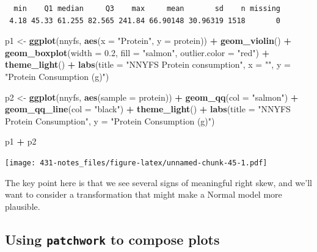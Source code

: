 \documentclass[
]{book}
\newenvironment{Shaded}{\begin{snugshade}}{\end{snugshade}}
\newcommand{\DataTypeTok}[1]{\textcolor[rgb]{0.13,0.29,0.53}{#1}}
\newcommand{\FloatTok}[1]{\textcolor[rgb]{0.00,0.00,0.81}{#1}}
\newcommand{\KeywordTok}[1]{\textcolor[rgb]{0.13,0.29,0.53}{\textbf{#1}}}
\newcommand{\NormalTok}[1]{#1}
\newcommand{\OperatorTok}[1]{\textcolor[rgb]{0.81,0.36,0.00}{\textbf{#1}}}
\newcommand{\StringTok}[1]{\textcolor[rgb]{0.31,0.60,0.02}{#1}}
\begin{document}
\begin{verbatim}
  min    Q1 median     Q3    max     mean       sd    n missing
 4.18 45.33 61.255 82.565 241.84 66.90148 30.96319 1518       0
\end{verbatim}

\begin{Shaded}
\begin{Highlighting}[]
\NormalTok{p1 <-}\StringTok{ }\KeywordTok{ggplot}\NormalTok{(nnyfs, }\KeywordTok{aes}\NormalTok{(}\DataTypeTok{x =} \StringTok{"Protein"}\NormalTok{, }\DataTypeTok{y =}\NormalTok{ protein)) }\OperatorTok{+}
\StringTok{    }\KeywordTok{geom_violin}\NormalTok{() }\OperatorTok{+}
\StringTok{    }\KeywordTok{geom_boxplot}\NormalTok{(}\DataTypeTok{width =} \FloatTok{0.2}\NormalTok{, }\DataTypeTok{fill =} \StringTok{"salmon"}\NormalTok{, }
                 \DataTypeTok{outlier.color =} \StringTok{"red"}\NormalTok{) }\OperatorTok{+}
\StringTok{    }\KeywordTok{theme_light}\NormalTok{() }\OperatorTok{+}
\StringTok{    }\KeywordTok{labs}\NormalTok{(}\DataTypeTok{title =} \StringTok{"NNYFS Protein consumption"}\NormalTok{,}
         \DataTypeTok{x =} \StringTok{""}\NormalTok{, }\DataTypeTok{y =} \StringTok{"Protein Consumption (g)"}\NormalTok{)}

\NormalTok{p2 <-}\StringTok{ }\KeywordTok{ggplot}\NormalTok{(nnyfs, }\KeywordTok{aes}\NormalTok{(}\DataTypeTok{sample =}\NormalTok{ protein)) }\OperatorTok{+}
\StringTok{    }\KeywordTok{geom_qq}\NormalTok{(}\DataTypeTok{col =} \StringTok{"salmon"}\NormalTok{) }\OperatorTok{+}\StringTok{ }
\StringTok{    }\KeywordTok{geom_qq_line}\NormalTok{(}\DataTypeTok{col =} \StringTok{"black"}\NormalTok{) }\OperatorTok{+}
\StringTok{    }\KeywordTok{theme_light}\NormalTok{() }\OperatorTok{+}
\StringTok{    }\KeywordTok{labs}\NormalTok{(}\DataTypeTok{title =} \StringTok{"NNYFS Protein Consumption"}\NormalTok{,}
         \DataTypeTok{y =} \StringTok{"Protein Consumption (g)"}\NormalTok{)}

\NormalTok{p1 }\OperatorTok{+}\StringTok{ }\NormalTok{p2}
\end{Highlighting}
\end{Shaded}

\texttt{[image: 431-notes\_files/figure-latex/unnamed-chunk-45-1.pdf]}

The key point here is that we see several signs of meaningful right skew, and we'll want to consider a transformation that might make a Normal model more plausible.

\hypertarget{using-patchwork-to-compose-plots}{%
\subsection{\texorpdfstring{Using \texttt{patchwork} to compose plots}{Using patchwork to compose plots}}\label{using-patchwork-to-compose-plots}}
\end{document}
